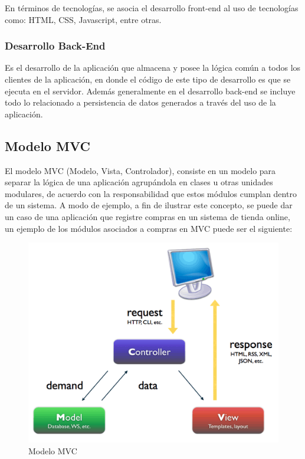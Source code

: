 En términos de tecnologías, se asocia el desarrollo front-end al uso de tecnologías como: HTML, CSS, Javascript, entre otras.

\subsubsection{Desarrollo Back-End} %
\label{ssub:desarrollo_back_end}


Es el desarrollo de la aplicación que almacena y posee la lógica común a todos los clientes de la aplicación, en donde el código de este tipo de desarrollo es que se ejecuta en el servidor. Además generalmente en el desarrollo back-end se incluye todo lo relacionado a persistencia de datos generados a través del uso de la aplicación.


\subsection{Modelo MVC} %
\label{sub:modelo_mvc}
El modelo MVC (Modelo, Vista, Controlador)\cite{mvc}, consiste en un modelo para separar la lógica de una aplicación agrupándola en clases u otras unidades modulares, de acuerdo con la responsabilidad que estos módulos cumplan dentro de un sistema. A modo de ejemplo, a fin de ilustrar este concepto, se puede dar un caso de una aplicación que registre compras en un sistema de tienda online, un ejemplo de los módulos asociados a compras en MVC puede ser el siguiente:

\begin{figure}[!h]
  \centering
  \includegraphics[scale=.5]{images/mvc.png}
  \caption{Modelo MVC}
  \label{modelomvc}
\end{figure}

